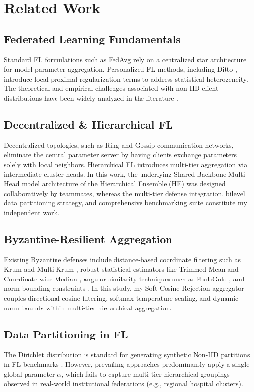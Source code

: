 \documentclass[11pt, a4paper]{article}
\begin{document}
\section{Related Work}

\subsection{Federated Learning Fundamentals}
Standard FL formulations such as FedAvg \cite{mcmahan2017} rely on a centralized star architecture for model parameter aggregation. Personalized FL methods, including Ditto \cite{li2021}, introduce local proximal regularization terms to address statistical heterogeneity. The theoretical and empirical challenges associated with non-IID client distributions have been widely analyzed in the literature \cite{zhao2018, karimireddy2020}.

\subsection{Decentralized \& Hierarchical FL}
Decentralized topologies, such as Ring and Gossip communication networks, eliminate the central parameter server by having clients exchange parameters solely with local neighbors. Hierarchical FL \cite{liu2020} introduces multi-tier aggregation via intermediate cluster heads. In this work, the underlying Shared-Backbone Multi-Head model architecture of the Hierarchical Ensemble (HE) was designed collaboratively by teammates, whereas the multi-tier defense integration, bilevel data partitioning strategy, and comprehensive benchmarking suite constitute my independent work.

\subsection{Byzantine-Resilient Aggregation}
Existing Byzantine defenses include distance-based coordinate filtering such as Krum and Multi-Krum \cite{blanchard2017}, robust statistical estimators like Trimmed Mean and Coordinate-wise Median \cite{yin2018}, angular similarity techniques such as FoolsGold \cite{fung2020}, and norm bounding constraints \cite{sun2019}. In this study, my Soft Cosine Rejection aggregator couples directional cosine filtering, softmax temperature scaling, and dynamic norm bounds within multi-tier hierarchical aggregation.

\subsection{Data Partitioning in FL}
The Dirichlet distribution is standard for generating synthetic Non-IID partitions in FL benchmarks \cite{hsu2019}. However, prevailing approaches predominantly apply a single global parameter $\alpha$, which fails to capture multi-tier hierarchical groupings observed in real-world institutional federations (e.g., regional hospital clusters).
\end{document}
